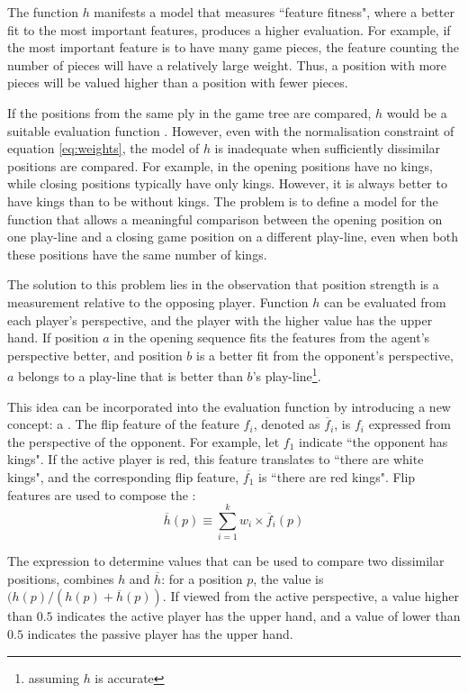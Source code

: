 The function $h$ manifests a model that measures ``feature fitness", where a better fit to the most important features, produces a higher evaluation. For example, if the most important feature is to have many game pieces, the feature counting the number of pieces will have a relatively large weight. Thus, a position with more pieces will be valued higher than a position with fewer pieces.

If the positions from the same ply in the game tree are compared, $h$ would be a suitable evaluation function \cite{furnkranz:survey}.  However, even with the normalisation constraint of equation \ref{eq:weights}, the model of $h$ is inadequate when sufficiently dissimilar positions are compared. For example, in  the opening positions have no kings, while closing positions typically have only kings.  However, it is always better to have kings than to be without kings. The problem is to define a model for the function that allows a meaningful comparison between the opening position on one play-line and a closing game position on a different play-line, even when both these positions have the same number of kings.  

The solution to this problem lies in the observation that position strength is a measurement  relative to the opposing player.  Function $h$ can be evaluated from each player's perspective, and the player with the higher value has the upper hand. If position $a$ in the opening sequence fits the features from the agent's perspective better, and position $b$ is a better fit from the opponent's perspective, $a$ belongs to a play-line that is better than $b$'s play-line\footnote{assuming $h$ is accurate}.  

This idea can be incorporated into the evaluation function by introducing a new concept: a .   The flip feature of the feature $f_i$, denoted as $\overline{f}_i$, is $f_i$ expressed from the perspective of the opponent. For example, let $f_1$ indicate ``the opponent has kings".  If the active player is red, this feature translates to ``there are white kings", and the corresponding flip feature, $\overline{f_1}$ is ``there are red kings".  Flip features are used to compose the :
\begin{equation}
\overline{h}(p) \equiv \sum_{i=1}^k w_i \times \overline{f}_i(p)  
\label{eq:smallh}
\end{equation}

The expression to determine values that can be used to compare two dissimilar positions, combines  $h$ and $\overline{h}$: for a position $p$, the value is  $(h(p) / (h(p)+\overline{h}(p))$.  If viewed from the active perspective, a value higher than $0.5$ indicates the active player has the upper hand, and a value of lower than $0.5$ indicates the passive player has the upper hand.  


